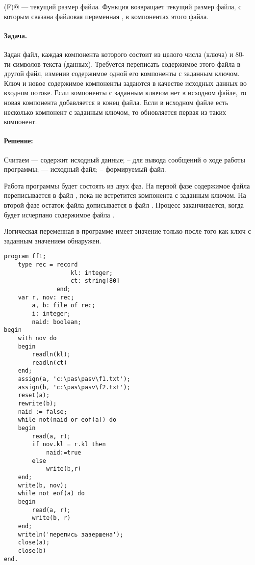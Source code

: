 \documentclass[12pt,a4paper]{article}
\theoremstyle{plain}
\theoremstyle{definition}
\theoremstyle{remark}
\begin{document}
\verb@FileSize(F)@ --- текущий размер файла. Функция возвращает текущий размер файла, с которым связана файловая переменная \verb@F@, в компонентах этого файла.

\paragraph*{Задача.} Задан файл, каждая компонента которого состоит из целого числа (ключа) и 80-ти символов текста (данных). Требуется переписать содержимое этого файла в другой файл, изменив содержимое одной его компоненты с заданным ключом. Ключ и новое содержимое компоненты задаются в качестве исходных данных во входном потоке. Если компоненты с заданным ключом нет в исходном файле, то новая компонента добавляется в конец файла. Если в исходном файле есть несколько компонент с заданным ключом, то обновляется первая из таких компонент.

\paragraph*{Решение:}

Считаем \verb@input@ --- содержит исходный данные; \verb@output@ – для вывода сообщений о ходе работы программы;  --- исходный файл; \verb@b@ – формируемый файл.

Работа программы будет состоять из двух фаз. На первой фазе содержимое файла  переписывается в файл \verb@b@, пока не встретится компонента с заданным ключом. На второй фазе остаток файла  дописывается в файл \verb@b@. Процесс заканчивается, когда будет исчерпано содержимое файла .

Логическая переменная \verb@naid@ в программе имеет значение \verb@true@ только после того как ключ с заданным значением обнаружен.

\begin{verbatim}
program ff1;
    type rec = record
                   kl: integer;
                   ct: string[80]
               end;
    var r, nov: rec;
        a, b: file of rec;
        i: integer;
        naid: boolean;
begin
    with nov do
    begin
        readln(kl);
        readln(ct)
    end;
    assign(a, 'c:\pas\pasv\f1.txt');
    assign(b, 'c:\pas\pasv\f2.txt');
    reset(a);
    rewrite(b);
    naid := false;
    while not(naid or eof(a)) do
    begin
        read(a, r);
        if nov.kl = r.kl then
            naid:=true
        else
            write(b,r)
    end;
    write(b, nov);
    while not eof(a) do
    begin
        read(a, r);
        write(b, r)
    end;
    writeln('перепись завершена');
    close(a);
    close(b)
end.
\end{verbatim}
\end{document}
